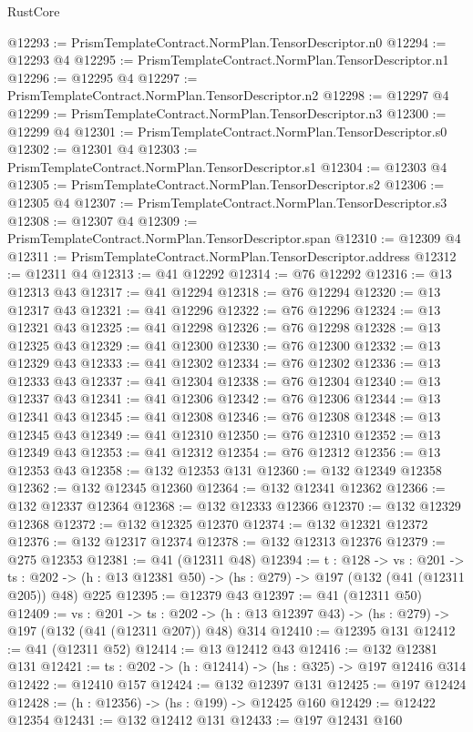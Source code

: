 \begin{lexlean}{RustCore}
\begin{coremodule}
@12293 := PrismTemplateContract.NormPlan.TensorDescriptor.n0
@12294 := @12293 @4
@12295 := PrismTemplateContract.NormPlan.TensorDescriptor.n1
@12296 := @12295 @4
@12297 := PrismTemplateContract.NormPlan.TensorDescriptor.n2
@12298 := @12297 @4
@12299 := PrismTemplateContract.NormPlan.TensorDescriptor.n3
@12300 := @12299 @4
@12301 := PrismTemplateContract.NormPlan.TensorDescriptor.s0
@12302 := @12301 @4
@12303 := PrismTemplateContract.NormPlan.TensorDescriptor.s1
@12304 := @12303 @4
@12305 := PrismTemplateContract.NormPlan.TensorDescriptor.s2
@12306 := @12305 @4
@12307 := PrismTemplateContract.NormPlan.TensorDescriptor.s3
@12308 := @12307 @4
@12309 := PrismTemplateContract.NormPlan.TensorDescriptor.span
@12310 := @12309 @4
@12311 := PrismTemplateContract.NormPlan.TensorDescriptor.address
@12312 := @12311 @4
@12313 := @41 @12292
@12314 := @76 @12292
@12316 := @13 @12313 @43
@12317 := @41 @12294
@12318 := @76 @12294
@12320 := @13 @12317 @43
@12321 := @41 @12296
@12322 := @76 @12296
@12324 := @13 @12321 @43
@12325 := @41 @12298
@12326 := @76 @12298
@12328 := @13 @12325 @43
@12329 := @41 @12300
@12330 := @76 @12300
@12332 := @13 @12329 @43
@12333 := @41 @12302
@12334 := @76 @12302
@12336 := @13 @12333 @43
@12337 := @41 @12304
@12338 := @76 @12304
@12340 := @13 @12337 @43
@12341 := @41 @12306
@12342 := @76 @12306
@12344 := @13 @12341 @43
@12345 := @41 @12308
@12346 := @76 @12308
@12348 := @13 @12345 @43
@12349 := @41 @12310
@12350 := @76 @12310
@12352 := @13 @12349 @43
@12353 := @41 @12312
@12354 := @76 @12312
@12356 := @13 @12353 @43
@12358 := @132 @12353 @131
@12360 := @132 @12349 @12358
@12362 := @132 @12345 @12360
@12364 := @132 @12341 @12362
@12366 := @132 @12337 @12364
@12368 := @132 @12333 @12366
@12370 := @132 @12329 @12368
@12372 := @132 @12325 @12370
@12374 := @132 @12321 @12372
@12376 := @132 @12317 @12374
@12378 := @132 @12313 @12376
@12379 := @275 @12353
@12381 := @41 (@12311 @48)
@12394 := {t : @128} ->
  {vs : @201} ->
  {ts : @202} -> (h : @13 @12381 @50) -> (hs : @279) -> @197 (@132 (@41 (@12311 @205)) @48) @225
@12395 := @12379 @43
@12397 := @41 (@12311 @50)
@12409 := {vs : @201} ->
  {ts : @202} -> (h : @13 @12397 @43) -> (hs : @279) -> @197 (@132 (@41 (@12311 @207)) @48) @314
@12410 := @12395 @131
@12412 := @41 (@12311 @52)
@12414 := @13 @12412 @43
@12416 := @132 @12381 @131
@12421 := {ts : @202} -> (h : @12414) -> (hs : @325) -> @197 @12416 @314
@12422 := @12410 @157
@12424 := @132 @12397 @131
@12425 := @197 @12424
@12428 := (h : @12356) -> (hs : @199) -> @12425 @160
@12429 := @12422 @12354
@12431 := @132 @12412 @131
@12433 := @197 @12431 @160

\end{coremodule}
\end{lexlean}
